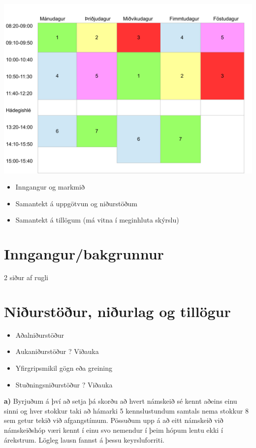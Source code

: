\documentclass[a4paper,12pt]{article}
\begin{document}
\begin{center}
\includegraphics[scale=0.3]{stundatafla}
\end{center}

\begin{itemize}
\item Inngangur og markmið
\item Samantekt á uppgötvun og niðurstöðum
\item Samantekt á tillögum (má vitna í meginhluta skýrslu)
\end{itemize}


\section{Inngangur/bakgrunnur}


2 siður af rugli





\section{Niðurstöður, niðurlag og tillögur}
\begin{itemize}
\item Aðalniðurstöður
	

\item Aukaniðurstöður ? Viðauka
\item Yfirgripsmikil gögn eða greining
\item Stuðningsniðurstöður ? Viðauka
\end{itemize}

\textbf{a) } Byrjuðum á því að setja þá skorðu að hvert námskeið sé kennt aðeins einu sinni og hver stokkur taki að hámarki 5 kennslustundum samtals nema stokkur 8 sem getur tekið við afgangstímum. Pössuðum upp á að eitt námskeið við námskeiðshóp væri kennt í einu svo nemendur í þeim hópum lentu ekki í árekstrum. Lögleg lausn fannst á þessu keyrsluforriti.
\end{document}
